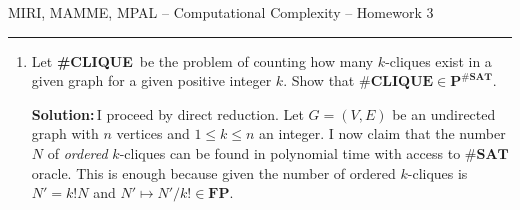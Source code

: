 \documentclass{amsart}
\theoremstyle{plain}
\theoremstyle{definition}
\newcommand{\p}{\textbf{P}}
\newcommand{\fp}{\textbf{FP}}
\newcommand{\sharpclique}{\textbf{\#CLIQUE}}
\newcommand{\sharpsat}{\textbf{\#SAT}}
\newcommand{\sol}{\textbf{Solution:\,}}
\begin{document}
    {\Large MIRI, MAMME, MPAL -- Computational Complexity -- Homework 3}

    \vspace{0.5cm}

    \hrule

    \vspace{0.5cm}

    \begin{enumerate}[label=\textbf{Exercise \arabic*:}, leftmargin=0cm, labelwidth=-0.2cm, align=left]

        \item Let \sharpclique\, be the problem of counting how many $k$-cliques exist in a given graph
        for a given positive integer $k$.
        Show that $\sharpclique \in \p^{\sharpsat}$.

           \sol I proceed by direct reduction.
            Let $G = (V, E)$ be an undirected graph with $n$ vertices
            and $1 \leq k \leq n$ an integer.
            I now claim that the number $N$ of \emph{ordered}
            $k$-cliques can be found in polynomial time
            with access to $\sharpsat$ oracle.
            This is enough because given the number
            of ordered $k$-cliques is $N' = k!N$ and
            $N' \mapsto N'/k! \in \fp$.


\end{enumerate}
\end{document}

